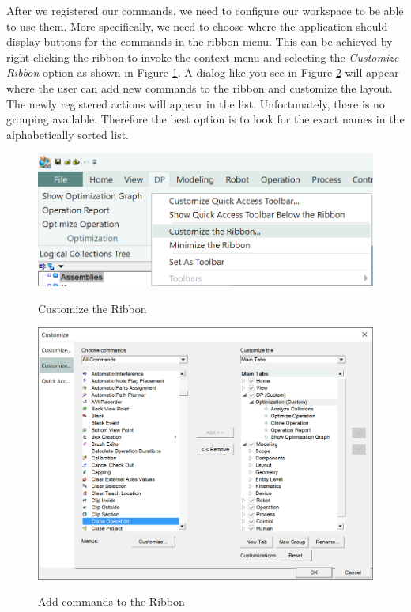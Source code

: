 After we registered our commands, we need to configure our workspace to be able to use them. More specifically, we need to choose where the application should display buttons for the commands in the ribbon menu. This can be achieved by right-clicking the ribbon to invoke the context menu and selecting the \emph{Customize Ribbon} option as shown in Figure \ref{fig:CustomizeRibbonContextMenu}. A dialog like you see in Figure \ref{fig:CustomizeRibbonDialog} will appear where the user can add new commands to the ribbon and customize the layout. The newly registered actions will appear in the list. Unfortunately, there is no grouping available. Therefore the best option is to look for the exact names in the alphabetically sorted list.

\begin{figure}[H]
    \caption{Customize the Ribbon}
    \centering
    \includegraphics{customizeribbon}
    \label{fig:CustomizeRibbonContextMenu}
\end{figure}

\begin{figure}[H]
    \caption{Add commands to the Ribbon}
    \centering
    \includegraphics[width=\textwidth]{addcommands}
    \label{fig:CustomizeRibbonDialog}
\end{figure}

